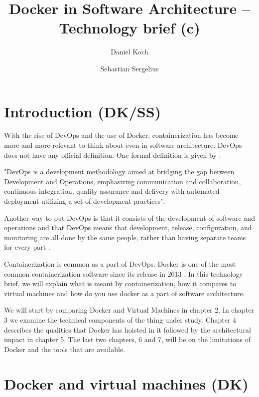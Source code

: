 \documentclass[fleqn,12pt]{olplainarticle}
\title{Docker in Software Architecture – Technology brief (c)}
\author[1]{Daniel Koch}
\author[2]{Sebastian Sergelius}
\affil[1]{daniel.koch@helsinki.fi}
\affil[2]{sebastian.sergelius@helsinki.fi}
\begin{document}
\flushbottom
\maketitle
\thispagestyle{empty}
\pagebreak
\tableofcontents
\section{Introduction (DK/SS)}

With the rise of DevOps and the use of Docker, containerization has become more and more relevant to think about even in software architecture. DevOps does not have any official definition.
One formal definition is given by \cite{Jabbari_devops}: 
\begin{displayquote}
"DevOps is a development methodology aimed at bridging the gap between Development and Operations, emphasizing communication and collaboration, continuous integration, quality assurance and delivery with automated deployment utilizing a set of development practices".
\end{displayquote}
Another way to put DevOps is that it consists of the development of software and operations and that DevOps means that development, release, configuration, and monitoring are all done by the same people, rather than having separate teams for every part \citep{hy:DevOps_with_Docker}.

Containerization is common as a part of DevOps. Docker is one of the most common containerization software since its release in 2013 \citep{aquasec:orchestration}. In this technology brief, we will explain what is meant by containerization, how it compares to virtual machines and how do you use docker as a part of software architecture. 

We will start by comparing Docker and Virtual Machines in chapter 2. In chapter 3 we examine the technical components of the thing under study. Chapter 4 describes the qualities that Docker has hoisted in it followed by the architectural impact in chapter 5. The last two chapters, 6 and 7, will be on the limitations of Docker and the tools that are available.


\section{Docker and virtual machines (DK)}
\end{document}
